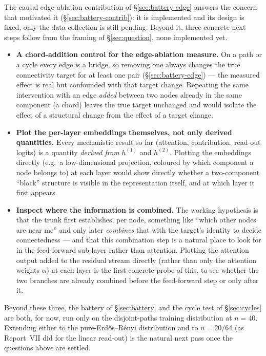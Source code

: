 \documentclass[11pt,a4paper]{article}
\begin{document}
The causal edge-ablation contribution of \S\ref{sec:battery-edge} answers the
concern that motivated it (\S\ref{sec:battery-contrib}): it is implemented and
its design is fixed, only the data collection is still pending. Beyond it,
three concrete next steps follow from the framing of \S\ref{sec:question},
none implemented yet.

\begin{itemize}\setlength\itemsep{0.15em}
  \item \textbf{A chord-addition control for the edge-ablation measure.} On a
        path or a cycle every edge is a bridge, so removing one always changes
        the true connectivity target for at least one pair
        (\S\ref{sec:battery-edge}) --- the measured effect is real but
        confounded with that target change. Repeating the same intervention
        with an edge \emph{added} between two nodes already in the same
        component (a chord) leaves the true target unchanged and would isolate
        the effect of a structural change from the effect of a target change.
  \item \textbf{Plot the per-layer embeddings themselves, not only derived
        quantities.} Every mechanistic result so far (attention, contribution,
        read-out logits) is a quantity \emph{derived from} $h^{(1)}$ and
        $h^{(2)}$. Plotting the embeddings directly (e.g.\ a low-dimensional
        projection, coloured by which component a node belongs to) at each
        layer would show directly whether a two-component ``block''
        structure is visible in the representation itself, and at which
        layer it first appears.
  \item \textbf{Inspect where the information is combined.} The working
        hypothesis is that the trunk first establishes, per node, something
        like ``which other nodes are near me'' and only later \emph{combines}
        that with the target's identity to decide connectedness --- and that
        this combination step is a natural place to look for in the
        feed-forward sub-layer rather than attention. Plotting the attention
        output added to the residual stream directly (rather than only the
        attention weights $\alpha$) at each layer is the first concrete probe
        of this, to see whether the two branches are already combined before
        the feed-forward step or only after it.
\end{itemize}

Beyond these three, the battery of \S\ref{sec:battery} and the cycle test of
\S\ref{sec:cycles} are both, for now, run only on the disjoint-paths
training distribution at $n=40$. Extending either to the pure-Erd\H{o}s--R\'enyi
distribution and to $n=20/64$ (as Report~VII did for the linear read-out) is
the natural next pass once the questions above are settled.
\end{document}
